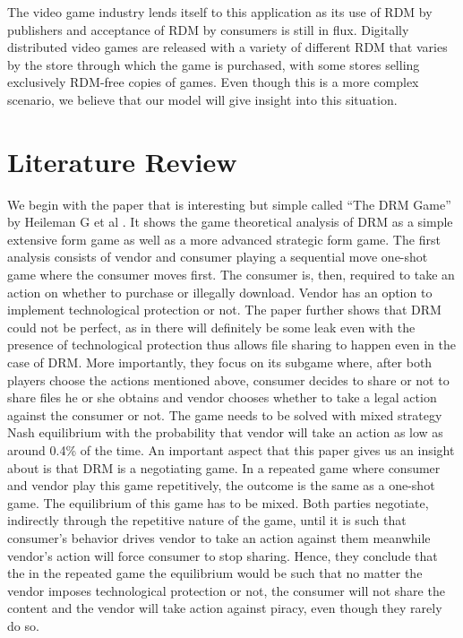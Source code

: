 \documentclass[a4paper,12pt]{article}
\numberwithin{equation}{section}
\begin{document}
The video game industry lends itself to this application as its use of RDM by publishers and acceptance of RDM by consumers is still in flux. Digitally distributed video games are released with a variety of different RDM that varies by the store through which the game is purchased, with some stores selling exclusively RDM-free copies of games. Even though this is a more complex scenario, we believe that our model will give insight into this situation.

\section{Literature Review}

We begin with the paper that is interesting but simple called ``The DRM Game'' by Heileman G et al \cite{heileman2007}. It shows the game theoretical analysis of DRM as a simple extensive form game as well as a more advanced strategic form game. The first analysis consists of vendor and consumer playing a sequential move one-shot game where the consumer moves first. The consumer is, then, required to take an action on whether to purchase or illegally download. Vendor has an option to implement technological protection or not. The paper further shows that DRM could not be perfect, as in there will definitely be some leak even with the presence of technological protection thus allows file sharing to happen even in the case of DRM. More importantly, they focus on its subgame where, after both players choose the actions mentioned above, consumer decides to share or not to share files he or she obtains and vendor chooses whether to take a legal action against the consumer or not. The game needs to be solved with mixed strategy Nash equilibrium with the probability that vendor will take an action as low as around 0.4\% of the time. An important aspect that this paper gives us an insight about is that DRM is a negotiating game. In a repeated game where consumer and vendor play this game repetitively, the outcome is the same as a one-shot game. The equilibrium of this game has to be mixed. Both parties negotiate, indirectly through the repetitive nature of the game, until it is such that consumer’s behavior drives vendor to take an action against them meanwhile vendor’s action will force consumer to stop sharing. Hence, they conclude that the in the repeated game the equilibrium would be such that no matter the vendor imposes technological protection or not, the consumer will not share the content and the vendor will take action against piracy, even though they rarely do so.\\
\end{document}
